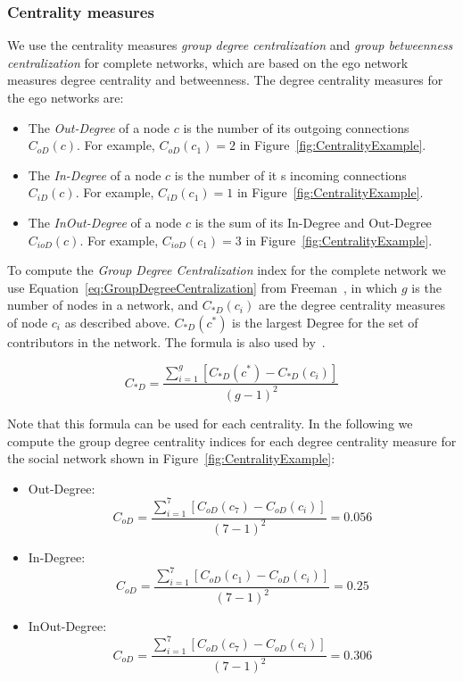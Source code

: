 \subsubsection{Centrality measures}
We use the centrality measures \emph{group degree centralization} and
\emph{group betweenness centralization} for complete networks, which are based on
the ego network measures degree centrality and betweenness. The degree
centrality measures for the ego networks are:

\begin{itemize}
  \item The \emph{Out-Degree} of a node $c$ is the
  number of its outgoing connections $C_{oD}(c)$. For example, $C_{oD}(c_1)=2$ in 
  Figure~\ref{fig:CentralityExample}.
  
  \item The \emph{In-Degree} of a node $c$ is the
  number of it s incoming connections $C_{iD}(c)$. For example, $C_{iD}(c_1)=1$ 
  in Figure~\ref{fig:CentralityExample}.
  
  \item The \emph{InOut-Degree} of a node $c$ is the sum of its In-Degree and
  Out-Degree $C_{ioD}(c)$. For example, $C_{ioD}(c_1)=3$
  in Figure~\ref{fig:CentralityExample}.
\end{itemize}

To compute the \emph{Group Degree Centralization} index for the complete network
we use Equation~\ref{eq:GroupDegreeCentralization} from
Freeman~\cite{Freeman:1979rl}, in which $g$ is the number of nodes in a network,
and $C_{*D}(c_i)$ are the degree centrality measures of node $c_i$ as
described above. $C_{*D}(c^*)$ is the largest Degree for the set of
contributors in the network. 
The formula is also used by~\cite{Gloor:2003cikm,hinds:cscw:2006}.

\begin{equation}
\displaystyle C_{*D} =  \frac{\sum_{i=1}^g[C_{*D}(c^*) - C_{*D}(c_i)]}{(g-1)^2}
\label{eq:GroupDegreeCentralization}
\end{equation}

Note that this formula can be used for each centrality. In the following we compute the group degree centrality indices for each degree centrality measure for the social network shown in Figure~\ref{fig:CentralityExample}:
\begin{itemize}
\item Out-Degree:
\begin{equation}
\displaystyle C_{oD} = \frac{\sum_{i=1}^7[C_{oD}(c_7) - C_{oD}(c_i)]}{(7-1)^2} = 0.056
\end{equation}
\item In-Degree:
\begin{equation}
\displaystyle C_{oD} = \frac{\sum_{i=1}^7[C_{oD}(c_1) - C_{oD}(c_i)]}{(7-1)^2} = 0.25
\end{equation}
\item InOut-Degree:
\begin{equation}
\displaystyle C_{oD} = \frac{\sum_{i=1}^7[C_{oD}(c_7) - C_{oD}(c_i)]}{(7-1)^2} = 0.306
\end{equation}
\end{itemize}

